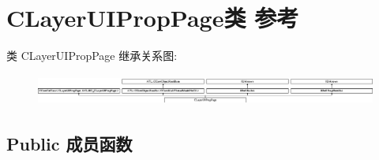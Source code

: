 \hypertarget{class_c_layer_u_i_prop_page}{}\section{C\+Layer\+U\+I\+Prop\+Page类 参考}
\label{class_c_layer_u_i_prop_page}
类 C\+Layer\+U\+I\+Prop\+Page 继承关系图\+:\begin{figure}[H]
\begin{center}
\leavevmode
\includegraphics[height=1.039604cm]{class_c_layer_u_i_prop_page}
\end{center}
\end{figure}
\subsection*{Public 成员函数}
